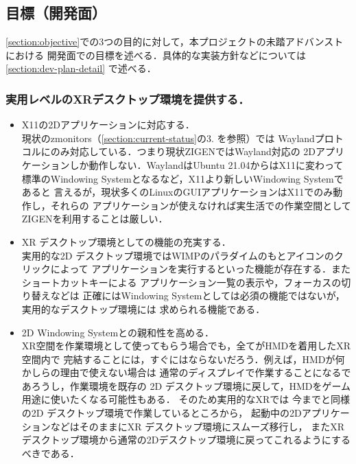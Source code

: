 \subsection{目標（開発面）}

\ref*{section:objective}での3つの目的に対して，本プロジェクトの未踏アドバンストにおける
開発面での目標を述べる．具体的な実装方針などについては\ref{section:dev-plan-detail}
で述べる．

\subsubsection*{実用レベルのXRデスクトップ環境を提供する．}

\begin{itemize}
  \item X11の2Dアプリケーションに対応する．\\
        現状のzmonitors（\ref{section:current-status}の3. を参照）では %
        Waylandプロトコルにのみ対応している．つまり現状ZIGENではWayland対応の
        2Dアプリケーションしか動作しない．WaylandはUbuntu 21.04からはX11に変わって
        標準のWindowing Systemとなるなど，X11より新しいWindowing Systemであると
        言えるが，現状多くのLinuxのGUIアプリケーションはX11でのみ動作し，それらの
        アプリケーションが使えなければ実生活での作業空間としてZIGENを利用することは厳しい．

  \item XR デスクトップ環境としての機能の充実する．\\
        実用的な2D デスクトップ環境ではWIMPのパラダイムのもとアイコンのクリックによって
        アプリケーションを実行するといった機能が存在する．またショートカットキーによる
        アプリケーション一覧の表示や，フォーカスの切り替えなどは
        正確にはWindowing Systemとしては必須の機能ではないが，実用的なデスクトップ環境には
        求められる機能である．

  \item 2D Windowing Systemとの親和性を高める．\\
        XR空間を作業環境として使ってもらう場合でも，全てがHMDを着用したXR空間内で
        完結することには，すぐにはならないだろう．例えば，HMDが何かしらの理由で使えない場合は
        通常のディスプレイで作業することになるであろうし，作業環境を既存の
        2D デスクトップ環境に戻して，HMDをゲーム用途に使いたくなる可能性もある．
        そのため実用的なXRでは 今までと同様の2D デスクトップ環境で作業しているところから，
        起動中の2DアプリケーションなどはそのままにXR デスクトップ環境にスムーズ移行し，
        またXRデスクトップ環境から通常の2Dデスクトップ環境に戻ってこれるようにするべきである．
\end{itemize}


